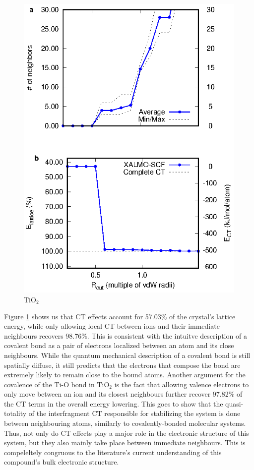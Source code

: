 \documentclass[aps,prb,twocolumn,amsmath,amssymb,superscriptaddress,longbibliography]{revtex4-1}
\begin{document}
\begin{figure}
\includegraphics[scale=1]{plots/TiO2_EvR}
\caption{$\text{TiO}_{2}$}
\label{tio2graph}
\end{figure}

Figure \ref{tio2graph} shows us that CT effects account for 57.03\% of the crystal's lattice energy, while only allowing local CT between ions and their immediate neighbours recovers 98.76\%.
This is consistent with the intuitve description of a covalent bond as a pair of electrons localized between an atom and its close neighbours. While the quantum mechanical description of a covalent bond is still spatially diffuse, it still predicts that the electrons that compose the bond are extremely likely to remain close to the bound atoms.
Another argument for the covalence of the Ti-O bond in $\text{TiO}_{2}$ is the fact that allowing valence electrons to only move between an ion and its closest neighbours further recover 97.82\% of the CT terms in the overall energy lowering. 
This goes to show that the quasi-totality of the interfragment CT responsible for stabilizing the system is done between neighbouring atoms, similarly to covalently-bonded molecular systems. 
Thus, not only do CT effects play a major role in the electronic structure of this system, but they also mainly take place between immediate neighbours. 
This is compeleltely congruous to the literature's current understanding of this compound's bulk electronic structure.\\
\end{document}
